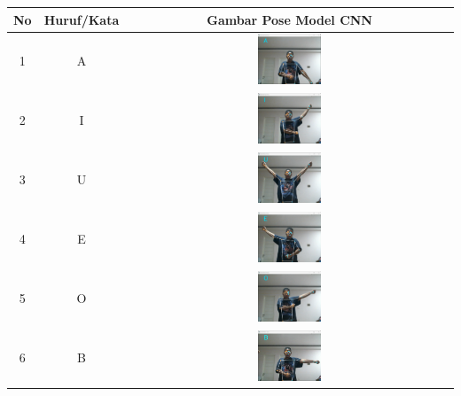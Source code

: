 \begin{table}[!hbt]
	\centering
	\label{tbl:Tabel Contoh Huruf/Kata dan Gambar Pose Model CNN Orang Kedua}
	\begin{tabular}{|c|c|c|}
	\hline
	No & Huruf/Kata & Gambar Pose Model CNN \\
	\hline
	1 & A & \includegraphics[width=0.2\textwidth]{gambar/bener/HurufA_ModelCNN_Fachry.png} \\
	\hline
	2 & I & \includegraphics[width=0.2\textwidth]{gambar/bener/HurufI_ModelCNN_Fachry.png} \\
	\hline
	3 & U & \includegraphics[width=0.2\textwidth]{gambar/bener/HurufU_ModelCNN_Fachry.png} \\
	\hline
	4 & E & \includegraphics[width=0.2\textwidth]{gambar/bener/HurufE_ModelCNN_Fachry.png} \\
	\hline
	5 & O & \includegraphics[width=0.2\textwidth]{gambar/bener/HurufO_ModelCNN_Fachry.png} \\
	\hline
	6 & B & \includegraphics[width=0.2\textwidth]{gambar/bener/HurufB_ModelCNN_Fachry.png} \\

\end{tabular}
\end{table}

